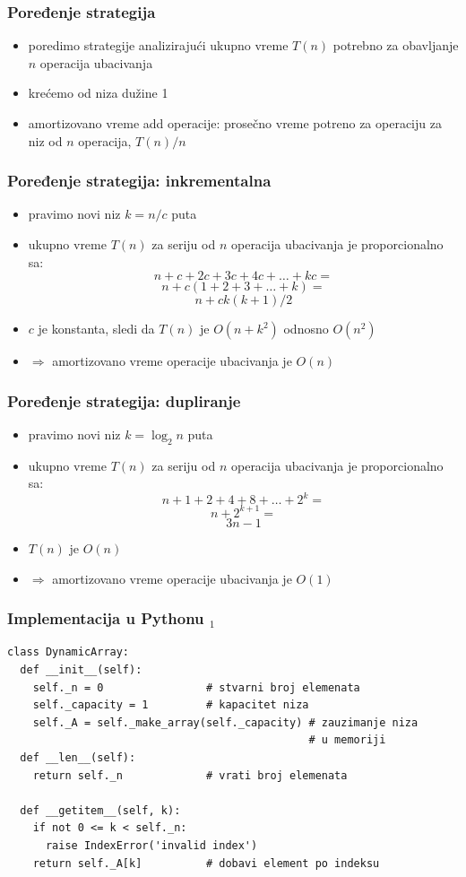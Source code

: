 \documentclass[compress,aspectratio=169]{beamer}
\begin{document}
\begin{frame}[fragile]
  \frametitle{Poređenje strategija}
  \begin{itemize}
    \item poredimo strategije analizirajući ukupno vreme $T(n)$ potrebno za
    obavljanje $n$ operacija ubacivanja
    \item krećemo od niza dužine 1
    \item amortizovano vreme add operacije: prosečno vreme potreno za operaciju
    za niz od $n$ operacija, $T(n)/n$
  \end{itemize}
\end{frame}

\begin{frame}[fragile]
  \frametitle{Poređenje strategija: inkrementalna}
  \begin{itemize}
    \item pravimo novi niz $k = n/c$ puta
    \item ukupno vreme $T(n)$ za seriju od $n$ operacija ubacivanja je
    proporcionalno sa:
    $$ n + c + 2c + 3c + 4c + \ldots + kc = $$
    $$ n + c(1 + 2 + 3 + \ldots + k) = $$
    $$ n + ck(k+1)/2$$
    \item $c$ je konstanta, sledi da $T(n)$ je $O(n+k^2)$ odnosno $O(n^2)$
    \item $\Rightarrow$ amortizovano vreme operacije ubacivanja je $O(n)$
  \end{itemize}
\end{frame}

\begin{frame}[fragile]
  \frametitle{Poređenje strategija: dupliranje}
  \begin{itemize}
    \item pravimo novi niz $k = \log_2 n$ puta
    \item ukupno vreme $T(n)$ za seriju od $n$ operacija ubacivanja je
    proporcionalno sa:
    $$ n + 1 + 2 + 4 + 8 + \ldots + 2^k = $$
    $$ n + 2^{k+1} = $$
    $$ 3n - 1$$
    \item $T(n)$ je $O(n)$
    \item $\Rightarrow$ amortizovano vreme operacije ubacivanja je $O(1)$
  \end{itemize}
\end{frame}

\begin{frame}[fragile,shrink=15]
  \frametitle{Implementacija u Pythonu $_1$}
\begin{verbatim}
class DynamicArray:
  def __init__(self):
    self._n = 0                # stvarni broj elemenata
    self._capacity = 1         # kapacitet niza
    self._A = self._make_array(self._capacity) # zauzimanje niza
                                               # u memoriji
  def __len__(self):
    return self._n             # vrati broj elemenata
    
  def __getitem__(self, k):
    if not 0 <= k < self._n:
      raise IndexError('invalid index')
    return self._A[k]          # dobavi element po indeksu
\end{verbatim}
\end{frame}
\end{document}
